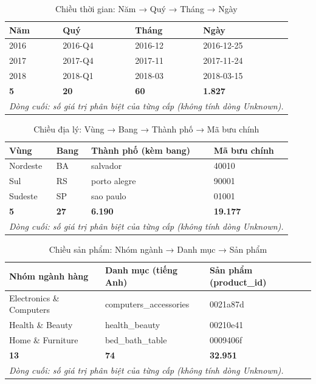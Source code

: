 \begin{table}[htbp]\centering\scriptsize\caption{Chiều thời gian: Năm → Quý → Tháng → Ngày}\label{tab:hier-dim-date}
\begin{tabular}{llll}\toprule
\textbf{Năm} & \textbf{Quý} & \textbf{Tháng} & \textbf{Ngày}\\\midrule
2016 & 2016-Q4 & 2016-12 & 2016-12-25\\
2017 & 2017-Q4 & 2017-11 & 2017-11-24\\
2018 & 2018-Q1 & 2018-03 & 2018-03-15\\
\midrule
\textbf{5} & \textbf{20} & \textbf{60} & \textbf{1.827}\\
\multicolumn{4}{l}{\footnotesize\emph{Dòng cuối: số giá trị phân biệt của từng cấp (không tính dòng Unknown).}}\\
\bottomrule\end{tabular}\end{table}

\begin{table}[htbp]\centering\scriptsize\caption{Chiều địa lý: Vùng → Bang → Thành phố → Mã bưu chính}\label{tab:hier-dim-geography}
\begin{tabular}{llll}\toprule
\textbf{Vùng} & \textbf{Bang} & \textbf{Thành phố (kèm bang)} & \textbf{Mã bưu chính}\\\midrule
Nordeste & BA & salvador & 40010\\
Sul & RS & porto alegre & 90001\\
Sudeste & SP & sao paulo & 01001\\
\midrule
\textbf{5} & \textbf{27} & \textbf{6.190} & \textbf{19.177}\\
\multicolumn{4}{l}{\footnotesize\emph{Dòng cuối: số giá trị phân biệt của từng cấp (không tính dòng Unknown).}}\\
\bottomrule\end{tabular}\end{table}

\begin{table}[htbp]\centering\scriptsize\caption{Chiều sản phẩm: Nhóm ngành → Danh mục → Sản phẩm}\label{tab:hier-dim-product}
\begin{tabular}{lll}\toprule
\textbf{Nhóm ngành hàng} & \textbf{Danh mục (tiếng Anh)} & \textbf{Sản phẩm (product\_id)}\\\midrule
Electronics \& Computers & computers\_accessories & 0021a87d\\
Health \& Beauty & health\_beauty & 00210e41\\
Home \& Furniture & bed\_bath\_table & 0009406f\\
\midrule
\textbf{13} & \textbf{74} & \textbf{32.951}\\
\multicolumn{3}{l}{\footnotesize\emph{Dòng cuối: số giá trị phân biệt của từng cấp (không tính dòng Unknown).}}\\
\bottomrule\end{tabular}\end{table}

